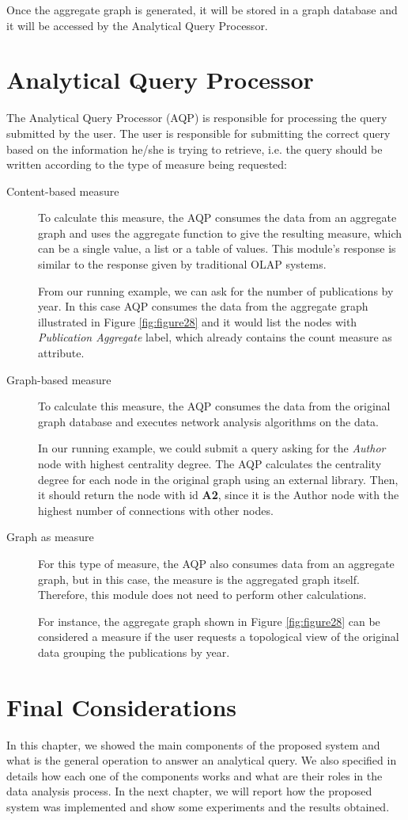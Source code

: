 Once the aggregate graph is generated, it will be stored in a graph database and it will be accessed by the Analytical Query Processor.

\section{Analytical Query Processor}

The Analytical Query Processor (AQP) is responsible for processing the query submitted by the user. The user is responsible for submitting the correct query based on the information he/she is trying to retrieve, i.e. the query should be written according to the type of measure being requested:
\begin{description}
\item[Content-based measure] To calculate this measure, the AQP consumes the data from an aggregate graph and uses the aggregate function to give the resulting measure, which can be a single value, a list or a table of values. This module's response is similar to the response given by traditional OLAP systems.

From our running example, we can ask for the number of publications by year. In this case AQP consumes the data from the aggregate graph illustrated in Figure \ref{fig:figure28} and it would list the nodes with \emph{Publication Aggregate} label, which already contains the count measure as attribute.

\item[Graph-based measure] To calculate this measure, the AQP consumes the data from the original graph database and executes network analysis algorithms on the data.

In our running example, we could submit a query asking for the \emph{Author} node with highest centrality degree. The AQP calculates the centrality degree for each node in the original graph using an external library. Then, it should return the node with id \textbf{A2}, since it is the Author node with the highest number of connections with other nodes.

\item[Graph as measure] For this type of measure, the AQP also consumes data from an aggregate graph, but in this case, the measure is the aggregated graph itself. Therefore, this module does not need to perform other calculations.

For instance, the aggregate graph shown in Figure \ref{fig:figure28} can be considered a measure if the user requests a topological view of the original data grouping the publications by year.
\end{description}

\section{Final Considerations}
In this chapter, we showed the main components of the proposed system and what is the general operation to answer an analytical query. We also specified in details how each one of the components works and what are their roles in the data analysis process. In the next chapter, we will report how the proposed system was implemented and show some experiments and the results obtained.